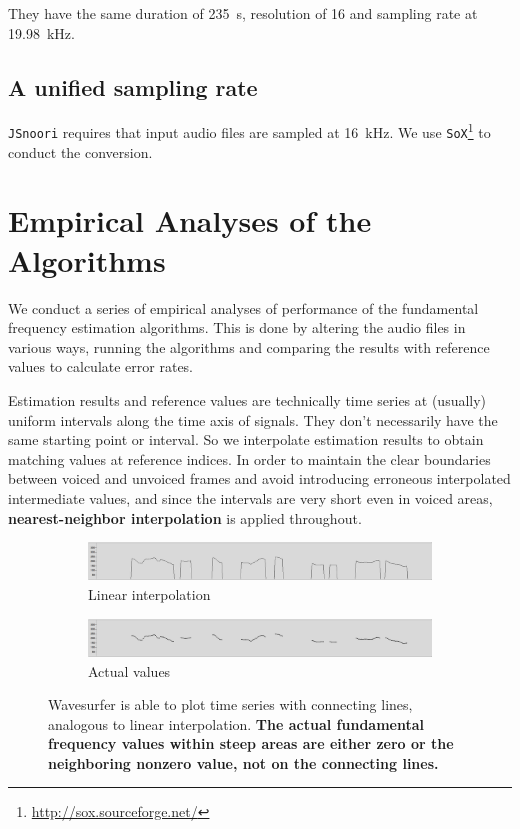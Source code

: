 \documentclass[11pt,a4paper]{report}
\begin{document}
They have the same duration of \SI{235}{\second}, resolution of \SI{16}{\bit} and sampling rate at \SI{19.98}{\kilo\hertz}.

\section{A unified sampling rate}

\texttt{JSnoori} requires that input audio files are sampled at \SI{16}{\kilo\hertz}.
We use \texttt{SoX}\footnote{\url{http://sox.sourceforge.net/}} to conduct the conversion.

\chapter{Empirical Analyses of the Algorithms} \label{emp-aly}

We conduct a series of empirical analyses of performance of the fundamental frequency estimation algorithms.
This is done by altering the audio files in various ways, running the algorithms and comparing the results with reference values to calculate error rates.

Estimation results and reference values are technically time series at (usually) uniform intervals along the time axis of signals.
They don't necessarily have the same starting point or interval.
So we interpolate estimation results to obtain matching values at reference indices.
In order to maintain the clear boundaries between voiced and unvoiced frames and avoid introducing erroneous interpolated intermediate values, and since the intervals are very short even in voiced areas, \textbf{nearest-neighbor interpolation} is applied throughout.

\begin{figure}[htbp]
  \centering
  \begin{subfigure}{\textwidth}
    \includegraphics[width=\textwidth]{f0s-lp.png}
    \caption{Linear interpolation}
    \label{fig:f0s-lp}
  \end{subfigure}

  \begin{subfigure}{\textwidth}
    \includegraphics[width=\textwidth]{f0s-real.png}
    \caption{Actual values}
    \label{fig:f0s-real}
  \end{subfigure}

  \caption[Data plotting options in Wavesurfer.]{Wavesurfer is able to plot time series with connecting lines, analogous to linear interpolation.
    \textbf{The actual fundamental frequency values within steep areas are either zero or the neighboring nonzero value, not on the connecting lines.}}
  \label{fig:f0s}
\end{figure}
\end{document}
